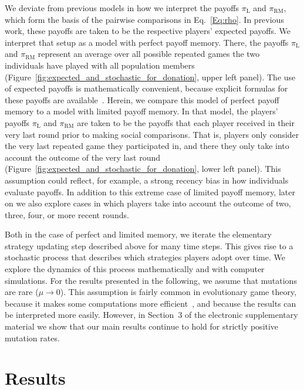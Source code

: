 \documentclass[11pt]{article}
\def\rolemodel{\text{RM}}
\def\learner{\text{L}}
\def\esm{electronic supplementary material}
\newcommand{\FigBaseResults}{Figure~\ref{fig:expected_and_stochastic_for_donation}}
\theoremstyle{plainCl1}
\theoremstyle{plainCl2}
\begin{document}
We deviate from previous models in how we interpret the payoffs $\pi_\learner$ and $\pi_\rolemodel$, which form the basis of the pairwise comparisons in Eq.~\eqref{Eq:rho}. 
In previous work, these payoffs are taken to be the respective players' expected payoffs. 
We interpret that setup as a model with perfect payoff memory. 
There, the payoffs  $\pi_\learner$ and $\pi_\rolemodel$ represent an average over all possible repeated games the two individuals have played with all population members (\FigBaseResults, upper left panel). 
The use of expected payoffs is mathematically convenient, because explicit formulas for these payoffs are available~\citep{hofbauer1998evolutionary}.
Herein, we compare this model of perfect payoff memory to a model with limited payoff memory. 
In that model, the players' payoffs $\pi_\learner$ and $\pi_\rolemodel$ are taken to be the payoffs that each player received in their very last round prior to making social comparisons. 
That is, players only consider the very last repeated game they participated in, and there they only take into account the outcome of the very last round (\FigBaseResults, lower left panel). 
This assumption could reflect, for example, a strong recency bias in how individuals evaluate payoffs.  
In addition to this extreme case of limited payoff memory, later on we also explore cases in which players take into account the outcome of two, three, four, or more recent rounds. 


Both in the case of perfect and limited memory, we iterate the elementary strategy updating step described above for many time steps. 
This gives rise to a stochastic process that describes which strategies players adopt over time. 
We explore the dynamics of this process mathematically and with computer simulations.
For the results presented in the following, we assume that mutations are rare (\(\mu\!\rightarrow\! 0\)). 
This assumption is fairly common in evolutionary game theory, because it makes some computations more efficient~\citep{fudenberg:JET:2006,wu:JMB:2012,mcavoy:jet:2015}, and because the results can be interpreted more easily.  
However, in Section~3 of the \esm{} we show that our main results continue to hold for strictly positive mutation rates.




\section{Results}
\end{document}
